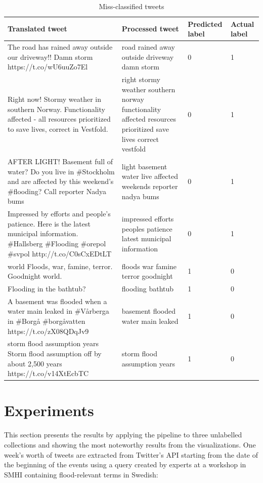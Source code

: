 \begin{table}
  \center
  \begin{tabular}{|p{5cm}|p{5cm}|l|l|}
    \hline
    Translated tweet & Processed tweet & Predicted label & Actual label\\
    \hline
    The road has rained away outside our driveway!! Damn storm https://t.co/wU6uuZo7El &
    road rained away outside driveway damn storm & 0 & 1 \\
    \hline
    Right now! Stormy weather in southern Norway. Functionality affected - all resources prioritized to save lives, correct in Vestfold. &
    right stormy weather southern norway functionality affected resources prioritized save lives correct vestfold & 0 & 1\\
    \hline
    AFTER LIGHT! Basement full of water? Do you live in \#Stockholm and are affected by this weekend's
    \#flooding? Call reporter Nadya bums &
    light basement water live affected weekends reporter nadya bums & 0 & 1\\
    \hline
    Impressed by efforts and people's patience. Here is the latest municipal information. \#Hallsberg
    \#Flooding \#orepol \#svpol http://t.co/C0sCxEDtLT &
    impressed efforts peoples patience latest municipal information & 0 & 1 \\
    \hline
    world Floods, war, famine, terror. Goodnight world. & 
    floods war famine terror goodnight & 1 & 0 \\
    \hline
    Flooding in the bathtub? & 
    flooding bathtub & 1 & 0 \\
    \hline
    A basement was flooded when a water main leaked in \#Vårberga in \#Borgå \#borgåvatten https://t.co/zX08QDqJv9 & 
    basement flooded water main leaked & 1 & 0 \\
    \hline
    storm flood assumption years Storm flood assumption off by about 2,500 years https://t.co/v14XtEcbTC & 
    storm flood assumption years & 1 & 0 \\
    \hline
  \end{tabular}
  \caption{Miss-classified tweets}
  \label{tab:tweets_missclassified}
\end{table}


\section{Experiments}%
\label{sec:Experiments}

This section presents the results by applying the pipeline to three unlabelled collections and
showing the most noteworthy results from the visualizations. One week's worth of tweets are
extracted from Twitter's API starting from the date of the beginning of the events using a query
created by experts at a workshop in \ac{SMHI} containing flood-relevant terms in Swedish:

